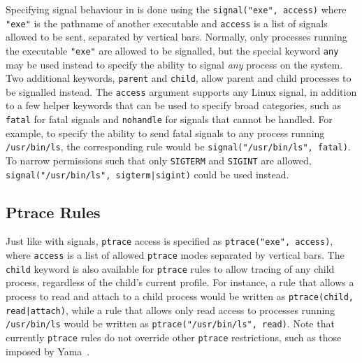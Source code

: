 Specifying signal behaviour in \bpfbox{} is done using the
\lstinline[language=bpfbox]{signal("exe", access)} where
\lstinline[language=bpfbox]{"exe"} is the pathname of another executable and
\lstinline[language=bpfbox]{access} is a list of signals allowed to be sent, separated by
vertical bars. Normally, only processes running the executable
\lstinline[language=bpfbox]{"exe"} are allowed to be signalled, but the special keyword
\lstinline[language=bpfbox]{any} may be used instead to specify the ability to signal
\textit{any} process on the system. Two additional keywords,
\lstinline[language=bpfbox]{parent} and \lstinline[language=bpfbox]{child}, allow parent
and child processes to be signalled instead.  The \lstinline[language=bpfbox]{access}
argument supports any Linux signal, in addition to a few helper keywords that can be used
to specify broad categories, such as \lstinline[language=bpfbox]{fatal} for fatal signals
and \lstinline[language=bpfbox]{nohandle} for signals that cannot be handled.  For
example, to specify the ability to send fatal signals to any process running
\texttt{/usr/bin/ls}, the corresponding \bpfbox{} rule would be
\lstinline[language=bpfbox]{signal("/usr/bin/ls", fatal)}.  To narrow permissions such
that only \texttt{SIGTERM} and \texttt{SIGINT} are allowed,
\lstinline[language=bpfbox]{signal("/usr/bin/ls", sigterm|sigint)} could be used instead.



\subsection{Ptrace Rules}%
\label{ss:bpfbox-ptrace-rules}

Just like with signals, \texttt{ptrace} access is specified as
\lstinline[language=bpfbox]{ptrace("exe", access)}, where
\lstinline[language=bpfbox]{access} is a list of allowed \texttt{ptrace} modes separated
by vertical bars. The \lstinline[language=bpfbox]{child} keyword is also available for
\texttt{ptrace} rules to allow tracing of any child process, regardless of the child's
current profile. For instance, a rule that allows a process to read and attach to a child
process would be written as \lstinline[language=bpfbox]{ptrace(child, read|attach)}, while
a rule that allows only read access to processes running \texttt{/usr/bin/ls} would be
written as \lstinline[language=bpfbox]{ptrace("/usr/bin/ls", read)}.  Note that currently
\texttt{ptrace} rules do not override other \texttt{ptrace} restrictions, such as those
imposed by Yama~\cite{yama}.



